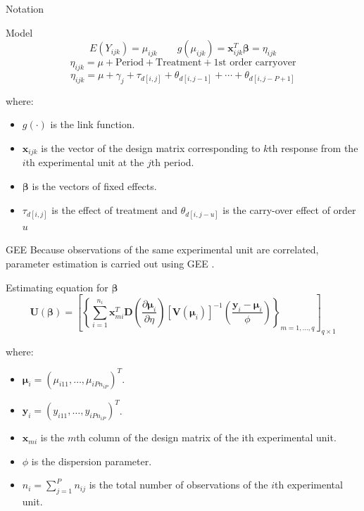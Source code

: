 \documentclass[t,9pt]{beamer}
\begin{document}
\begin{frame}[fragile]{Notation}
\vfill
 \begin{block}{Model}
     \begin{equation}\nonumber
      E(Y_{ijk})=\mu_{ijk} \qquad
     g(\mu_{ijk})=\pmb{x}^T_{ijk}\pmb{\beta} =\eta_{ijk}
 \end{equation}
 \begin{equation}\nonumber
      \eta_{ijk}=\mu +\text{Period} + \text{Treatment} +\text{1st order carryover}
 \end{equation} 
\begin{equation}\nonumber
      \eta_{ijk}= \mu +\gamma_j + \tau_{d[i,j]}+ \theta_{d[i,j-1]}+\cdots+\theta_{d[i,j-P+1]} 
\end{equation}

 \end{block}
 where:
\begin{itemize}
    \item $g(\cdot)$ is the link function.
    \item $\pmb{x}_{ijk}$ is the vector of the design matrix corresponding to $k$th response from the $i$th experimental unit at the  $j$th period.
    \item $\pmb{\beta}$ is the vectors of fixed effects.
    \item $\tau_{d[i,j]}$ is the effect of treatment and   $\theta_{d[i,j-u]}$  is the carry-over effect of order $u$
\end{itemize}

\end{frame}
 \begin{frame}[fragile]{GEE}
 Because observations of the same experimental unit are correlated, parameter estimation is carried out using GEE \citep{liang1986longitudinal}.
 \begin{block}{Estimating equation for $\pmb{\beta}$}
     \begin{equation}\nonumber
        \pmb{U}(\pmb{\beta})=\left[ \left\{\sum_{i=1}^{n_i} \pmb{x}_{mi}^T \pmb{D}\left( \frac{\partial \pmb{\mu}_i}{\partial\eta}\right) [\pmb{V}(\pmb{\mu}_i)]^{-1}\left(\frac{\pmb{y}_{i}- \pmb{\mu}_i}{\phi} \right) \right\}_{m=1, \ldots, q} \right]_{q\times 1} 
     \end{equation}
 \end{block}
 where:
 \begin{itemize}
     \item $\pmb{\mu}_i=(\mu_{i11}, \ldots, \mu_{iPn_{iP}})^T$.
     \item $\pmb{y}_{i}=(y_{i11}, \ldots, y_{iPn_{iP}})^T$.
     \item $\pmb{x}_{mi}$ is the $m$th column of the design matrix of the ith experimental unit.
     \item $\phi$ is the dispersion parameter.    
     \item $n_i=\sum_{j=1}^P n_{ij}$ is the total number of observations of the $i$th experimental unit.
 \end{itemize}
\end{frame}
\end{document}
